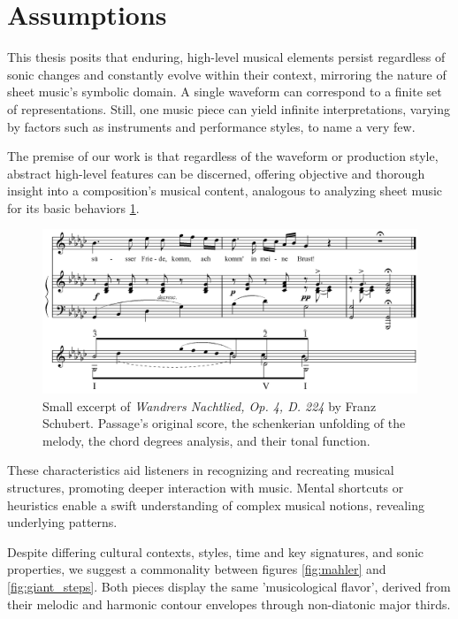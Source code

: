 \section{Assumptions}

This thesis posits that enduring, high-level musical elements persist regardless of sonic changes and constantly evolve within their context, mirroring the nature of sheet music's symbolic domain. A single waveform can correspond to a finite set of representations. Still, one music piece can yield infinite interpretations, varying by factors such as instruments and performance styles, to name a very few.

The premise of our work is that regardless of the waveform or production style, abstract high-level features can be discerned, offering objective and thorough insight into a composition's musical content, analogous to analyzing sheet music for its basic behaviors \ref{fig:Wandrers Nachtlied, Op. 4, D. 224}.


\begin{figure}[ht]
\includegraphics[clip,width=\columnwidth]{figures/schenkerian analysis/SchubertOp4no3.png}%
\caption[Excerpt of \textit{Wandrers Nachtlied, Op. 4, D. 224} by Franz Schubert.]{\small{Small excerpt of \textit{Wandrers Nachtlied, Op. 4, D. 224} by Franz Schubert. Passage's original score, the schenkerian unfolding of the melody, the chord degrees analysis, and their tonal function.}}
\label{fig:Wandrers Nachtlied, Op. 4, D. 224}
\end{figure}


These characteristics aid listeners in recognizing and recreating musical structures, promoting deeper interaction with music. Mental shortcuts or heuristics enable a swift understanding of complex musical notions, revealing underlying patterns.

Despite differing cultural contexts, styles, time and key signatures, and sonic properties, we suggest a commonality between figures \ref{fig:mahler} and \ref{fig:giant_steps}. Both pieces display the same 'musicological flavor', derived from their melodic and harmonic contour envelopes through non-diatonic major thirds.

